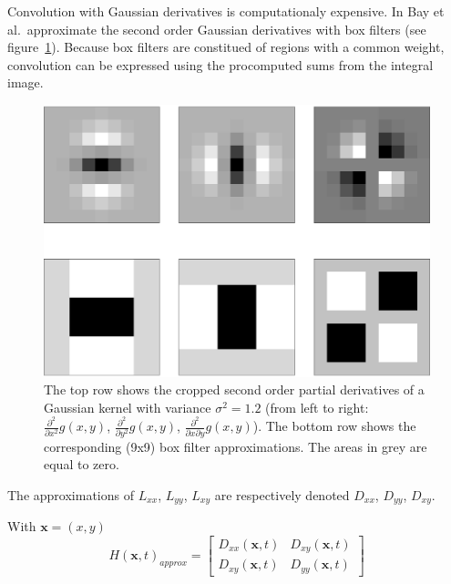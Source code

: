 Convolution with Gaussian derivatives is computationaly expensive. In \cite{Bay06surf} Bay et al.\ approximate the second order Gaussian derivatives with box filters (see figure~\ref{fig:gaussian_derivatives}). Because box filters are constitued of regions with a common weight, convolution can be expressed using the procomputed sums from the integral image.


\begin{figure}
    \centering
    \includegraphics[height=0.3\textheight]{img/gaussian-kernel-derivatives}
    \caption{
        The top row shows the cropped second order partial derivatives of a Gaussian kernel with variance $\sigma^2=1.2$ (from left to right:
        $\frac{\partial ^2}{\partial x^2} g(x,y)$, $\frac{\partial ^2}{\partial y^2} g(x,y)$, $\frac{\partial ^2}{\partial x \partial y} g(x,y)$).
        The bottom row shows the corresponding (9x9) box filter approximations.
        The areas in grey are equal to zero.
        \label{fig:gaussian_derivatives}
    }
\end{figure}

The approximations of $L_{xx}$, $L_{yy}$, $L_{xy}$ are respectively denoted $D_{xx}$, $D_{yy}$, $D_{xy}$.

With $\mathbf{x} = (x,y)$
\begin{equation}
    H(\mathbf{x},t)_{approx} = 
    \begin{bmatrix}
        D_{xx}(\mathbf{x},t) & D_{xy}(\mathbf{x},t) \\
        D_{xy}(\mathbf{x},t) & D_{yy}(\mathbf{x},t)
    \end{bmatrix}
\end{equation}

